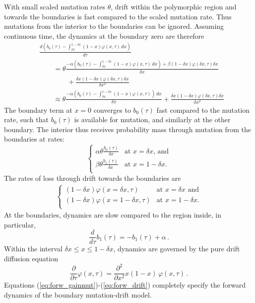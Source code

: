 \documentclass[preprint]{elsarticle}
\begin{document}
With small scaled mutation rates $\theta$, drift within the polymorphic region and towards the boundaries is fast compared to the scaled mutation rate. Thus mutations from the interior to the boundaries can be ignored. Assuming continuous time, the dynamics at the boundary zero are therefore
\begin{equation}
\begin{split}
    &\frac{d (b_0(\tau)-\int_{\delta x}^{1-\delta x}(1-x)\varphi(x,\tau)\,d x)}{d\tau} \\
    &\qquad=\theta \frac{-\alpha(b_0(\tau)-\int_{\delta x}^{1-\delta x}(1-x)\varphi(x,\tau)\,dx)+\beta(1-\delta x)\varphi(\delta x,\tau)\delta x}{\delta x}\\
    &\qquad\qquad+\frac{\delta x (1-\delta x)\varphi(\delta x,\tau)\delta x}{\delta x^2} \\   
    &\qquad\approx \theta \frac{-\alpha(b_0(\tau)-\int_{\delta x}^{1-\delta x}(1-x)\varphi(x,\tau))\,dx}{\delta x}+\frac{\delta x (1-\delta x)\varphi(\delta x,\tau)\delta x}{\delta x^2}    
\end{split}
\end{equation}
The boundary term at $x=0$ converges to $b_0(\tau)$ fast compared to the mutation rate, such that $b_0(\tau)$ is available for mutation, and similarly at the other boundary. The interior thus receives probability mass through mutation from the boundaries at rates:
\begin{equation}\label{eq:forw_gainmut}
\begin{cases}
\alpha\theta \frac{b_0(\tau)}{\delta x} &\text{at $x=\delta x$, and}\\
\beta\theta\frac{b_1(\tau)}{\delta x} &\text{at $x=1-\delta x$.}\\
\end{cases}
\end{equation}
The rates of loss through drift towards the boundaries are
\begin{align}\label{eq:forw_lossdrift}
  \begin{cases}
    (1-\delta x)\varphi(x=\delta x,\tau) &\text{at $x=\delta x$ and}\\
    (1-\delta x)\varphi(x=1-\delta x,\tau) &\text{at $x=1-\delta x$.}\\
\end{cases}
\end{align}
At the boundaries, dynamics are slow compared to the region inside, in particular, 
\begin{equation}\label{eq:forw_boundaries}
    \frac{d}{d\tau}b_1(\tau)=-b_1(\tau)+\alpha\,.
\end{equation}
Within the interval $\delta x\leq x \leq 1-\delta x$, dynamics are governed by the pure drift diffusion equation
\begin{equation}\label{eq:forw_drift}
  \frac{\partial}{\partial \tau} \varphi(x,\tau) =\frac{\partial^2}{\partial x^2}x(1-x)\,\varphi(x,\tau)\,.  
\end{equation}
Equations (\ref{eq:forw_gainmut})-(\ref{eq:forw_drift}) completely specify the forward dynamics of the boundary mutation-drift model.
\end{document}
